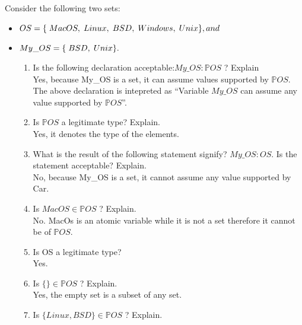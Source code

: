 \documentclass[12pt]{article}
\begin{document}
\noindent \text Consider the following two sets:
\begin{itemize}
      \item
            \(
            OS =
            \{
            \hspace{1mm} MacOS,
            \hspace{1mm} Linux,
            \hspace{1mm} BSD,
            \hspace{1mm} Windows,
            \hspace{1mm} Unix
            \}, and
            \)
      \item
            \(
            My\_OS =
            \{
            \hspace{1mm} BSD,
            \hspace{1mm} Unix
            \}.
            \)
            \begin{enumerate}
                  \item Is the following declaration acceptable:$My\_OS : \mathbb{P} OS$ ? Explain\\
                        \noindent Yes, because My\_OS is a set, it can assume values supported by $\mathbb{P} OS$. The above declaration is intepreted as ``Variable $My\_OS$ can assume any value supported by $\mathbb{P} OS$''.
                  \item Is $\mathbb{P} OS$ a legitimate type? Explain.\\
                        \noindent Yes, it denotes the type of the elements.
                  \item What is the result of the following statement signify?  $My\_OS : OS.$ Is the statement acceptable? Explain.\\
                        \noindent No, because My\_OS is a set, it cannot assume any value supported by Car.
                  \item Is $ MacOS \in \mathbb{P} OS$ ? Explain.\\
                        \noindent No. MacOs is an atomic variable while it is not a set therefore it cannot be of $\mathbb{P} OS$.
                  \item Is OS a legitimate type?\\
                        \noindent Yes.
                  \item Is $ \{\} \in \mathbb{P} OS$ ? Explain.\\
                        \noindent Yes, the empty set is a subset of any set.
                  \item Is $ \{Linux, BSD\} \in \mathbb{P} OS$ ? Explain.\\

\end{enumerate}
\end{itemize}
\end{document}
